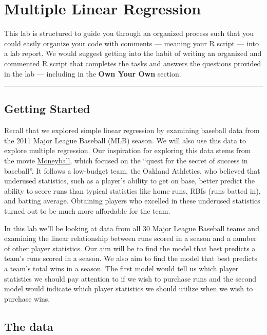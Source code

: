 \documentclass[]{book}
\theoremstyle{definition}
\theoremstyle{definition}
\theoremstyle{definition}
\theoremstyle{remark}
\begin{document}
\chapter{Multiple Linear Regression}\label{multiple-linear-regression}

This lab is structured to guide you through an organized process such
that you could easily organize your code with comments --- meaning your
R script --- into a lab report. We would suggest getting into the habit
of writing an organized and commented R script that completes the tasks
and answers the questions provided in the lab --- including in the
\textbf{Own Your Own} section.

\begin{center}\rule{0.5\linewidth}{\linethickness}\end{center}

\section{Getting Started}\label{getting-started-4}

Recall that we explored simple linear regression by examining baseball
data from the 2011 Major League Baseball (MLB) season. We will also use
this data to explore multiple regression. Our inspiration for exploring
this data stems from the movie
\href{http://en.wikipedia.org/wiki/Moneyball_(film)}{Moneyball}, which
focused on the ``quest for the secret of success in baseball''. It
follows a low-budget team, the Oakland Athletics, who believed that
underused statistics, such as a player's ability to get on base, better
predict the ability to score runs than typical statistics like home
runs, RBIs (runs batted in), and batting average. Obtaining players who
excelled in these underused statistics turned out to be much more
affordable for the team.

In this lab we'll be looking at data from all 30 Major League Baseball
teams and examining the linear relationship between runs scored in a
season and a number of other player statistics. Our aim will be to find
the model that best predicts a team's runs scored in a season. We also
aim to find the model that best predicts a team's total wins in a
season. The first model would tell us which player statistics we should
pay attention to if we wish to purchase runs and the second model would
indicate which player statistics we should utilize when we wish to
purchase wins.

\section{The data}\label{the-data-5}
\end{document}
